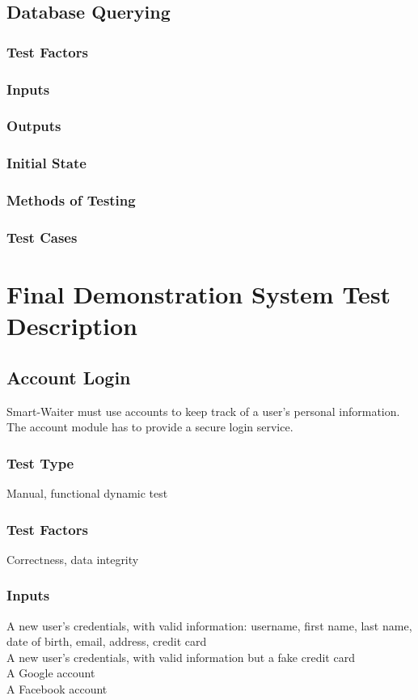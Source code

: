 \documentclass[12pt]{article}
\begin{document}
\subsection{Database Querying}

\subsubsection{Test Factors}
\subsubsection{Inputs}
\subsubsection{Outputs}
\subsubsection{Initial State}
\subsubsection{Methods of Testing}
\subsubsection{Test Cases}

\section{Final Demonstration System Test Description}

\subsection{Account Login}
Smart-Waiter must use accounts to keep track of a user's personal information. The account module has to provide a secure login service. 
\subsubsection{Test Type}
Manual, functional dynamic test
\subsubsection{Test Factors}
Correctness, data integrity
\subsubsection{Inputs}
A new user's credentials, with valid information: username, first name, last name, date of birth, email, address, credit card \\
A new user's credentials, with valid information but a fake credit card \\
A Google account \\
A Facebook account \\
\end{document}
